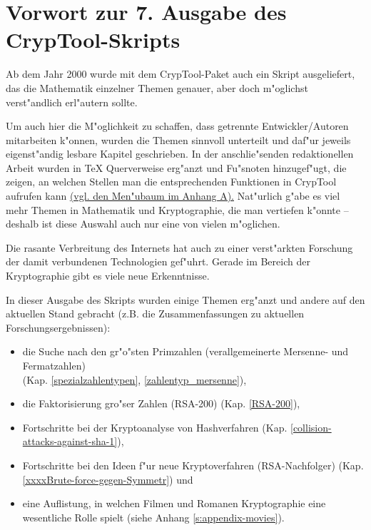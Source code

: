 

\section*{Vorwort zur 7. Ausgabe des CrypTool-Skripts}

Ab dem Jahr 2000 wurde mit dem CrypTool-Paket auch ein Skript 
ausgeliefert, das die Mathematik einzelner Themen genauer, aber doch 
m"oglichst verst"andlich erl"autern sollte.

Um auch hier die M"oglichkeit zu schaffen, dass getrennte Entwickler/Autoren
mitarbeiten k"onnen, wurden die Themen sinnvoll unterteilt und daf"ur jeweils
eigenst"andig lesbare Kapitel geschrieben. In der anschlie"senden redaktionellen
Arbeit wurden in TeX Querverweise erg"anzt und Fu"snoten hinzugef"ugt, die
zeigen, an welchen Stellen man die entsprechenden Funktionen in
CrypTool aufrufen kann 
\hyperlink{appendix-menutree}{(vgl. den Men"ubaum im Anhang A).}
Nat"urlich g"abe es viel mehr Themen in Mathematik und Kryptographie, die
man vertiefen k"onnte -- deshalb ist diese Auswahl auch nur eine von
vielen m"oglichen.

Die rasante Verbreitung des Internets hat auch zu einer verst"arkten 
Forschung der damit verbundenen Technologien gef"uhrt. Gerade im Bereich 
der Kryptographie gibt es viele neue Erkenntnisse.

In dieser Ausgabe des Skripts wurden einige Themen erg"anzt und andere auf
den aktuellen Stand gebracht (z.B. die Zusammenfassungen zu aktuellen 
Forschungsergebnissen):                   
\vspace{-7pt}
\begin{itemize}
  \item die Suche nach den gr"o"sten Primzahlen (verallgemeinerte
        Mersenne- und Fermatzahlen) \\
	(Kap. \ref{spezialzahlentypen}, \ref{zahlentyp_mersenne}),
  \item die Faktorisierung gro"ser Zahlen (RSA-200) 
        (Kap. \ref{RSA-200}),
  \item Fortschritte bei der Kryptoanalyse von Hashverfahren 
        (Kap. \ref{collision-attacks-against-sha-1}),
  \item Fortschritte bei den Ideen f"ur neue Kryptoverfahren (RSA-Nachfolger)
	(Kap. \ref{xxxxBrute-force-gegen-Symmetr}) und
  \item eine Auflistung, in welchen Filmen und Romanen Kryptographie eine
        wesentliche Rolle spielt (siehe Anhang \ref{s:appendix-movies}).
\end{itemize}

